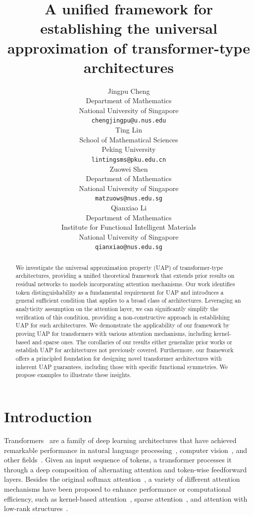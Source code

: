 \documentclass{article}
\title{A unified framework for establishing the universal approximation of transformer-type architectures}
\author{%
  Jingpu Cheng\\
      Department of Mathematics \\
   National University of Singapore\\
  \texttt{chengjingpu@u.nus.edu} \\
 \And
  Ting Lin \\
  School of Mathematical Sciences\\
  Peking University \\
  \texttt{lintingsms@pku.edu.cn} \\
  \And
  Zuowei Shen \\
    Department of Mathematics \\
   National University of Singapore\\
  \texttt{matzuows@nus.edu.sg} \\
    \And
  Qianxiao Li \\
  Department of Mathematics \\
 Institute for Functional Intelligent Materials \\
 National University of Singapore \\
  \texttt{qianxiao@nus.edu.sg} \\
}
\begin{document}
\maketitle

\begin{abstract}
    We investigate the universal approximation property (UAP) of transformer-type architectures, providing a unified theoretical framework that extends prior results on residual networks to models incorporating attention mechanisms. Our work identifies token distinguishability as a fundamental requirement for UAP and introduces a general sufficient condition that applies to a broad class of architectures. Leveraging an analyticity assumption on the attention layer, we can significantly simplify the verification of this condition, providing a non-constructive approach in establishing UAP for such architectures.
    We demonstrate the applicability of our framework by proving UAP for transformers with various attention mechanisms, including kernel-based and sparse ones. The corollaries of our results either generalize prior works or establish UAP for architectures not previously covered. Furthermore, our framework offers a principled foundation for designing novel transformer architectures with inherent UAP guarantees, including those with specific functional symmetries. We propose examples to illustrate these insights.
\end{abstract}


\section{Introduction}

Transformers~\cite{vaswani2017attention} are a family of deep learning architectures that have 
achieved remarkable performance in natural language processing~\cite{radford2018improving,radford2019language,brown2020language}, computer vision~\cite{dosovitskiy2020image,carion2020end}, and other fields~\cite{jumper2021highly}. 
Given an input sequence of tokens, a transformer processes it through a deep composition of alternating attention and token-wise feedforward layers.  Besides the original softmax attention~\cite{vaswani2017attention}, a variety of different attention mechanisms have been proposed to enhance performance or computational efficiency, such as kernel-based attention~\cite{choromanski2020rethinking,tsai2019transformer,chen2021skyformer,katharopoulos2020transformers}, sparse attention~\cite{beltagy2020longformer,zaheer2020big,kitaev2020reformer}, and attention with low-rank structures~\cite{wang2020linformer,zhu2021long}.
\end{document}
